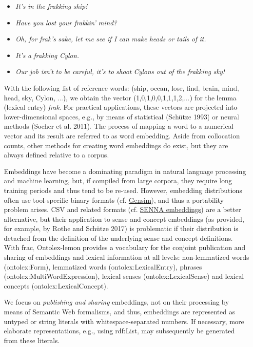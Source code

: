 \documentclass[a4paper]{article}
\newcommand\textstyleEmphasis[1]{\textit{#1}}
\newcommand\textstyleInternetlink[1]{\textcolor[rgb]{0.0,0.0,0.5019608}{#1}}
\newcommand\textstyleTeletype[1]{\textrm{#1}}
\newcommand\liststyleWWNumv{%
\renewcommand\labelitemi{[F0B7?]}
\renewcommand\labelitemii{[F0B7?]}
\renewcommand\labelitemiii{[F0B7?]}
\renewcommand\labelitemiv{[F0B7?]}
}
\begin{document}
\liststyleWWNumv
\begin{itemize}
\item \textit{It's in the frakking ship!} 
\item \textit{Have you lost your frakkin' mind?} 
\item \textit{Oh, for frak's sake, let me see if I can make heads or tails of it.} 
\item \textit{It's a frakking Cylon.} 
\item \textit{Our job isn't to be careful, it's to shoot Cylons out of the frakking sky!} 
\end{itemize}
With the following list of reference words: \textstyleTeletype{(ship, ocean, lose, find, brain, mind, head, sky, Cylon, ...)}, we obtain the vector \textstyleTeletype{(1,0,1,0,0,1,1,1,2,...)} for the lemma (lexical entry) \textit{frak}. For practical applications, these vectors are projected into lower-dimensional spaces, e.g., by means of statistical (Schütze 1993) or neural methods (Socher et al. 2011).%
%
%
 The process of mapping a word to a numerical vector and its result are referred to as {\textquotedbl}word embedding{\textquotedbl}. Aside from collocation counts, other methods for creating word embeddings do exist, but they are always defined relative to a corpus. 

Embeddings have become a dominating paradigm in natural language processing and machine learning, but, if compiled from large corpora, they require long training periods and thus tend to be re-used. However, embedding distributions often use tool-specific binary formats (cf. \href{https://radimrehurek.com/gensim/models/word2vec.html}{\textstyleInternetlink{Gensim}}), and thus a portability problem arises. CSV and related formats (cf. \href{https://github.com/baojie/senna/tree/master/embeddings}{\textstyleInternetlink{SENNA embeddings}}) are a better alternative, but their application to sense and concept embeddings (as provided, for example, by Rothe and Schütze 2017)%
%
%
 is problematic if their distribution is detached from the definition of the underlying sense and concept definitions. With frac, Ontolex-lemon provides a vocabulary for the conjoint publication and sharing of embeddings and lexical information at all levels: non-lemmatized words (ontolex:Form), lemmatized words (ontolex:LexicalEntry), phrases (ontolex:MultiWordExpression), lexical senses (ontolex:LexicalSense) and lexical concepts (ontolex:LexicalConcept).

We focus on \textstyleEmphasis{publishing and sharing} embeddings, not on their processing by means of Semantic Web formalisms, and thus, embeddings are represented as untyped or string literals with whitespace-separated numbers. If necessary, more elaborate representations, e.g., using rdf:List, may subsequently be generated from these literals.
\end{document}

